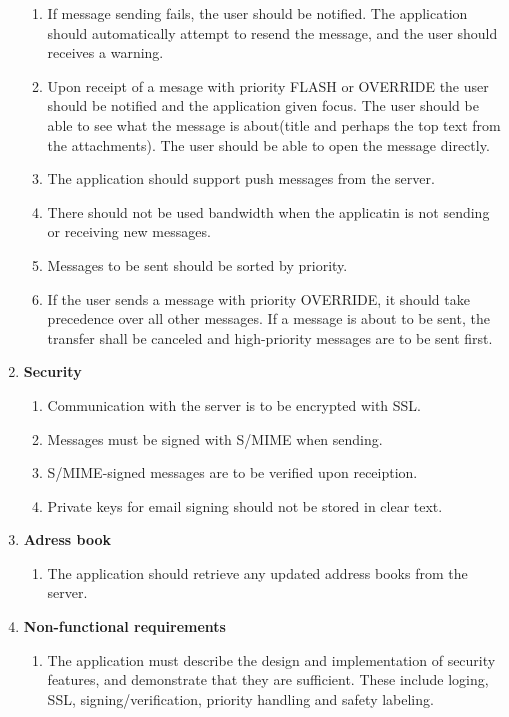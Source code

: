 \begin{enumerate}
\begin{enumerate}
\item{}If message sending fails, the user should be notified. The application should automatically attempt to resend the message, and the user should receives a warning.
\item{}Upon receipt of a mesage with priority FLASH or OVERRIDE the user should be notified and the application given focus. The user should be able to see what the message is about(title and perhaps the top text from the attachments). The user should be able to open the message directly.
\item{}The application should support push messages from the server.
\item{}There should not be used bandwidth when the applicatin is not sending or receiving new messages.
\item{}Messages to be sent should be sorted by priority.
\item{}If the user sends a message with priority OVERRIDE, it should take precedence over all other messages. If a message is about to be sent, the transfer shall be canceled and high-priority messages are to be sent first.
\end{enumerate}
\item{}\textbf{Security}
\begin{enumerate}
\item{}Communication with the server is to be encrypted with SSL.
\item{}Messages must be signed with S/MIME when sending.
\item{}S/MIME-signed messages are to be verified upon receiption.
\item{}Private keys for email signing should not be stored in clear text.
\end{enumerate}
\item{}\textbf{Adress book}
\begin{enumerate}
\item{}The application should retrieve any updated address books from the server.
\end{enumerate}
\item{}\textbf{Non-functional requirements}
\begin{enumerate}
\item{}The application must describe the design and implementation of security features, and demonstrate that they are sufficient. These include loging, SSL, signing/verification, priority handling and safety labeling.
\end{enumerate}
\end{enumerate}